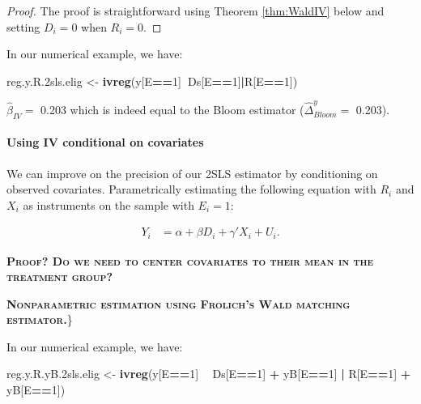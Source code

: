 \documentclass[]{book}
\newenvironment{Shaded}{\begin{snugshade}}{\end{snugshade}}
\newcommand{\DecValTok}[1]{\textcolor[rgb]{0.00,0.00,0.81}{#1}}
\newcommand{\FloatTok}[1]{\textcolor[rgb]{0.00,0.00,0.81}{#1}}
\newcommand{\KeywordTok}[1]{\textcolor[rgb]{0.13,0.29,0.53}{\textbf{#1}}}
\newcommand{\NormalTok}[1]{#1}
\newcommand{\OperatorTok}[1]{\textcolor[rgb]{0.81,0.36,0.00}{\textbf{#1}}}
\newcommand{\StringTok}[1]{\textcolor[rgb]{0.31,0.60,0.02}{#1}}
\let\oldparagraph\paragraph
\renewcommand{\paragraph}[1]{\oldparagraph{#1}\mbox{}}
\theoremstyle{definition}
\theoremstyle{definition}
\theoremstyle{definition}
\theoremstyle{remark}
\let\BeginKnitrBlock\begin \let\EndKnitrBlock\end
\begin{document}
\BeginKnitrBlock{proof}
\iffalse{} {Proof. } \fi{}The proof is straightforward using Theorem \ref{thm:WaldIV} below and setting \(D_i=0\) when \(R_i=0\).
\EndKnitrBlock{proof}

\BeginKnitrBlock{example}
\protect\hypertarget{exm:unnamed-chunk-99}{}{\label{exm:unnamed-chunk-99} }In our numerical example, we have:
\EndKnitrBlock{example}

\begin{Shaded}
\begin{Highlighting}[]
\NormalTok{reg.y.R}\FloatTok{.2}\NormalTok{sls.elig <-}\StringTok{ }\KeywordTok{ivreg}\NormalTok{(y[E}\OperatorTok{==}\DecValTok{1}\NormalTok{]}\OperatorTok{~}\NormalTok{Ds[E}\OperatorTok{==}\DecValTok{1}\NormalTok{]}\OperatorTok{|}\NormalTok{R[E}\OperatorTok{==}\DecValTok{1}\NormalTok{])}
\end{Highlighting}
\end{Shaded}

\(\hat{\beta}_{IV}=\) 0.203 which is indeed equal to the Bloom estimator (\(\hat{\Delta}^y_{Bloom}=\) 0.203).

\hypertarget{using-iv-conditional-on-covariates}{%
\paragraph{Using IV conditional on covariates}\label{using-iv-conditional-on-covariates}}

We can improve on the precision of our 2SLS estimator by conditioning on observed covariates.
Parametrically estimating the following equation with \(R_i\) and \(X_i\) as instruments on the sample with \(E_i=1\):

\begin{align*}
    Y_i &  = \alpha +  \beta D_i + \gamma' X_i + U_i.
\end{align*}

\textbf{\textsc{Proof? Do we need to center covariates to their mean in the treatment group?}}

\textbf{\textsc{Nonparametric estimation using Frolich's Wald matching estimator.}}\}

\BeginKnitrBlock{example}
\protect\hypertarget{exm:unnamed-chunk-100}{}{\label{exm:unnamed-chunk-100} }In our numerical example, we have:
\EndKnitrBlock{example}

\begin{Shaded}
\begin{Highlighting}[]
\NormalTok{reg.y.R.yB}\FloatTok{.2}\NormalTok{sls.elig <-}\StringTok{ }\KeywordTok{ivreg}\NormalTok{(y[E}\OperatorTok{==}\DecValTok{1}\NormalTok{] }\OperatorTok{~}\StringTok{ }\NormalTok{Ds[E}\OperatorTok{==}\DecValTok{1}\NormalTok{] }\OperatorTok{+}\StringTok{ }\NormalTok{yB[E}\OperatorTok{==}\DecValTok{1}\NormalTok{] }\OperatorTok{|}\StringTok{ }\NormalTok{R[E}\OperatorTok{==}\DecValTok{1}\NormalTok{] }\OperatorTok{+}\StringTok{ }\NormalTok{yB[E}\OperatorTok{==}\DecValTok{1}\NormalTok{])}
\end{Highlighting}
\end{Shaded}
\end{document}
